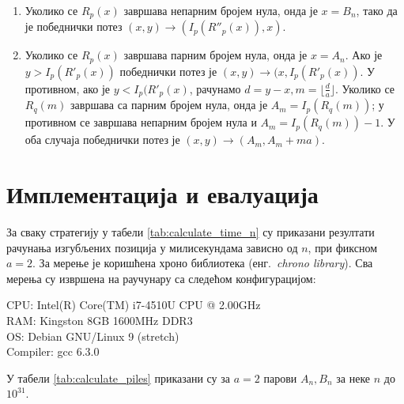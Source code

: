 \documentclass[a4paper]{article}
\begin{document}
\begin{enumerate}
	\item \label{item:neparne_nule} Уколико се $ R_{p}(x) $ завршава непарним бројем нула, онда је $ x = B_{n} $, тако да је победнички потез $ (x, y) \rightarrow (I_{p}(R''_{p}(x)), x) $.
	\item \label{item:parne_nule} Уколико се $ R_{p}(x) $ завршава парним бројем нула, онда је $ x = A_{n} $. Ако је $ y > I_{p}(R'_{p}(x)) $ победнички потез је $ (x, y) \rightarrow (x, I_{p}(R'_{p}(x)) $. У противном, ако је $ y < I_{p}(R'_{p}(x) $, рачунамо $ d = y - x, m = \lfloor \frac{d}{a} \rfloor $. Уколико се $ R_{q}(m) $ завршава са парним бројем нула, онда је $ A_{m} = I_{p}(R_{q}(m)) $; у противном се завршава непарним бројем нула и $ A_{m} = I_{p}(R_{q}(m)) - 1 $. У оба случаја победнички потез је $ (x, y) \rightarrow (A_{m}, A_{m} + ma) $.
\end{enumerate}

\section{Имплементација и евалуација}
\label{sec:implementacija_evaluacija}

За сваку стратегију у табели \ref{tab:calculate_time_n} су приказани резултати рачунања изгубљених позиција у милисекундама зависно од $ n $, при фиксном $ a = 2 $. 
За мерење је коришћена хроно библиотека (енг.{~\em chrono library}). Сва мерења су извршена на раучунару са следећом конфигурацијом:
\begin{flushleft}
	CPU: Intel(R) Core(TM) i7-4510U CPU @ 2.00GHz\\
	RAM: Kingston 8GB 1600MHz DDR3\\
	OS: Debian GNU/Linux 9 (stretch)\\
	Compiler: gcc 6.3.0\\
\end{flushleft}


У табели \ref{tab:calculate_piles} приказани су за $ a = 2 $ парови $ A_{n}, B_{n} $ за неке $ n $ до $ 10^{31} $.
\end{document}
